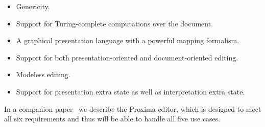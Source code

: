 \documentclass{speauth}
\begin{document}
\begin{itemize}
\item Genericity.
\item Support for Turing-complete computations over the document.
\item A graphical presentation language with a powerful mapping formalism.
\item Support for both presentation-oriented and document-oriented editing.
\item Modeless editing.
\item Support for presentation extra state as well as interpretation extra state.
\end{itemize}

In a companion paper~\cite{proximaarch} we describe the Proxima editor, which is designed to meet all six requirements and thus will be able to handle all five use cases. 






\end{document}
